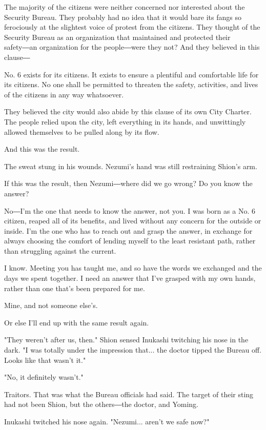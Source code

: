 The majority of the citizens were neither concerned nor interested about
the Security Bureau. They probably had no idea that it would bare its
fangs so ferociously at the slightest voice of protest from the
citizens. They thought of the Security Bureau as an organization that
maintained and protected their safety―an organization for the
people―were they not? And they believed in this clause―

No. 6 exists for its citizens. It exists to ensure a plentiful and
comfortable life for its citizens. No one shall be permitted to threaten
the safety, activities, and lives of the citizens in any way whatsoever.

They believed the city would also abide by this clause of its own City
Charter. The people relied upon the city, left everything in its hands,
and unwittingly allowed themselves to be pulled along by its flow.

And this was the result.

The sweat stung in his wounds. Nezumi's hand was still restraining
Shion's arm.

If this was the result, then Nezumi―where did we go wrong? Do you know
the answer?

No―I'm the one that needs to know the answer, not you. I was born as a
No. 6 citizen, reaped all of its benefits, and lived without any concern
for the outside or inside. I'm the one who has to reach out and grasp
the answer, in exchange for always choosing the comfort of lending
myself to the least resistant path, rather than struggling against the
current.

I know. Meeting you has taught me, and so have the words we exchanged
and the days we spent together. I need an answer that I've grasped with
my own hands, rather than one that's been prepared for me.

Mine, and not someone else's.

Or else I'll end up with the same result again.

"They weren't after us, then." Shion sensed Inukashi twitching his nose
in the dark. "I was totally under the impression that... the doctor
tipped the Bureau off. Looks like that wasn't it."

"No, it definitely wasn't."

Traitors. That was what the Bureau officials had said. The target of
their sting had not been Shion, but the others―the doctor, and Yoming.

Inukashi twitched his nose again. "Nezumi... aren't we safe now?"

